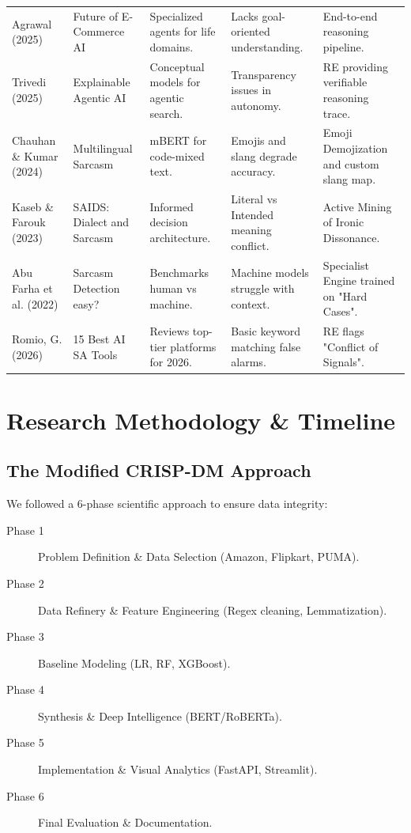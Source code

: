 \documentclass[11pt,oneside]{scrbook}
\begin{document}
\begin{longtable}{p{2.2cm}p{2.5cm}p{2.5cm}p{3.2cm}p{3.2cm}}
\addlinespace
Agrawal (2025) & Future of E-Commerce AI & Specialized agents for life domains. & Lacks goal-oriented understanding. & End-to-end reasoning pipeline. \\
\addlinespace
Trivedi (2025) & Explainable Agentic AI & Conceptual models for agentic search. & Transparency issues in autonomy. & RE providing verifiable reasoning trace. \\
\addlinespace
Chauhan \& Kumar (2024) & Multilingual Sarcasm & mBERT for code-mixed text. & Emojis and slang degrade accuracy. & Emoji Demojization and custom slang map. \\
\addlinespace
Kaseb \& Farouk (2023) & SAIDS: Dialect and Sarcasm & Informed decision architecture. & Literal vs Intended meaning conflict. & Active Mining of Ironic Dissonance. \\
\addlinespace
Abu Farha et al. (2022) & Sarcasm Detection easy? & Benchmarks human vs machine. & Machine models struggle with context. & Specialist Engine trained on "Hard Cases". \\
\addlinespace
Romio, G. (2026) & 15 Best AI SA Tools & Reviews top-tier platforms for 2026. & Basic keyword matching false alarms. & RE flags "Conflict of Signals". \\
\end{longtable}

\chapter{Research Methodology \& Timeline}

\section{The Modified CRISP-DM Approach}
We followed a 6-phase scientific approach to ensure data integrity:
\begin{description}
    \item[Phase 1] Problem Definition \& Data Selection (Amazon, Flipkart, PUMA).
    \item[Phase 2] Data Refinery \& Feature Engineering (Regex cleaning, Lemmatization).
    \item[Phase 3] Baseline Modeling (LR, RF, XGBoost).
    \item[Phase 4] Synthesis \& Deep Intelligence (BERT/RoBERTa).
    \item[Phase 5] Implementation \& Visual Analytics (FastAPI, Streamlit).
    \item[Phase 6] Final Evaluation \& Documentation.
\end{description}
\end{document}

